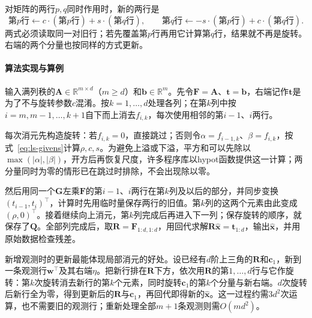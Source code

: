 对矩阵的两行$p,q$同时作用时，新的两行是
\[
 \text{第}p\text{行}\leftarrow c\cdot(\text{第}p\text{行})+s\cdot(\text{第}q\text{行}),\qquad
 \text{第}q\text{行}\leftarrow -s\cdot(\text{第}p\text{行})+c\cdot(\text{第}q\text{行}).
\]
两式必须读取同一对旧行；若先覆盖第$p$行再用它计算第$q$行，结果就不再是旋转。右端的两个分量也按同样的方式更新。

\paragraph{算法实现与算例}
输入满列秩的$\bm A\in\mathbb R^{m\times d}$（$m\geq d$）和$\bm b\in\mathbb R^m$。先令$\bm F=\bm A$、$\bm t=\bm b$，右端记作$\bm t$是为了不与旋转参数$c$混淆。按$k=1,\ldots,d$处理各列；在第$k$列中按$i=m,m-1,\ldots,k+1$自下而上消去$f_{i,k}$，每次使用相邻的第$i-1$、$i$两行。

每次消元先构造旋转：若$f_{i,k}=0$，直接跳过；否则令$\alpha=f_{i-1,k}$、$\beta=f_{i,k}$，按式~\eqref{eq:ls-givens}计算$\rho,c,s$。为避免上溢或下溢，平方和可以先除以$\max(\lvert\alpha\rvert,\lvert\beta\rvert)$，开方后再恢复尺度，许多程序库以hypot函数提供这一计算；两分量同时为零的情形已在跳过时排除，不会出现除以零。

然后用同一个$\bm G$左乘$\bm F$的第$i-1$、$i$两行在第$k$列及以后的部分，并同步变换$(t_{i-1},t_i)^\top$，计算时先用临时量保存两行的旧值。第$k$列的这两个元素由此变成$(\rho,0)^\top$。接着继续向上消元，第$k$列完成后再进入下一列；保存旋转的顺序，就保存了$\bm Q$。全部列完成后，取$\bm R=\bm F_{1:d,1:d}$，用回代求解$\bm R\hat{\bm x}=\bm t_{1:d}$，输出$\hat{\bm x}$，并用原始数据检查残差。

新增观测时的更新最能体现局部消元的好处。设已经有$d$阶上三角的$\bm R$和$\bm c_1$，新到一条观测行$\bm w^\top$及其右端$\eta$。把新行排在$\bm R$下方，依次用$\bm R$的第$1,\ldots,d$行与它作旋转：第$k$次旋转消去新行的第$k$个元素，同时旋转$\bm c_1$的第$k$个分量与新右端。$d$次旋转后新行全为零，得到更新后的$\bm R$与$\bm c_1$，再回代即得新的$\hat{\bm x}$。这一过程约需$3d^2$次运算，也不需要旧的观测行；重新处理全部$m+1$条观测则需$O(md^2)$。

